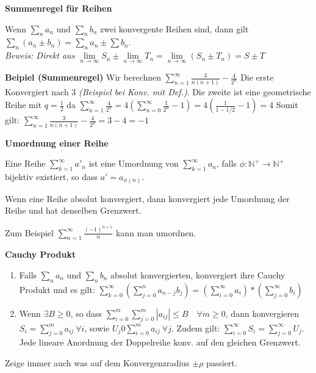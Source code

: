 \documentclass[25pt]{sciposter}
\newcommand{\limm}{\lim\limits_{n \to \infty}}
\newcommand{\N}{\mathbb{N}}
\newenvironment{method}[1]{\begin{mdframed}[backgroundcolor=blue!10,innertopmargin=15pt, innerbottommargin=15pt, nobreak=true]
		\textbf{#1 }
	}
	{ 
	\end{mdframed}
}
\newenvironment{important}{\begin{mdframed}[backgroundcolor=red!50,innertopmargin=15pt, innerbottommargin=15pt, nobreak=true]
		\Large
	}
	{ 
	\end{mdframed}
}
\begin{document}
\begin{multicols}{3}
\begin{method}{Summenregel für Reihen}
	Wenn $\sum_n a_n$ und $\sum_n b_n$ zwei konvergente Reihen sind, dann gilt $\sum_n (a_n \pm b_n ) = \sum_n a_n \pm \sum b_n$.\\
	\textit{Beweis: Direkt aus $\limm S_n \pm \limm T_n = \limm (S_n \pm T_n)  = S \pm T$}
\end{method}
\textbf{Beipiel (Summenregel)}
Wir berechnen $\sum_{n=1}^\infty \frac{3}{n(n+1)} - \frac{4}{2^n}$ Die erste Konvergiert nach $3$ \textit{(Beispiel bei Konv. mit Def.)}. Die zweite ist eine geometrische Reihe mit $q=\frac{1}{2}$ da $\sum_{n=1}^{\infty} \frac{4}{2^n} = 4\left( \sum_{n=0}^{\infty} \frac{1}{2^n} -1 \right) = 4 \left( \frac{1}{1-1/2} -1\right) = 4$
Somit gilt: $\sum_{n=1}^\infty \frac{3}{n(n+1)} - \frac{4}{2^n} = 3-4 = -1$ 


\begin{method}{Umordnung einer Reihe}
	Eine Reihe $\sum_{k=1}^{\infty} a'_n$ ist eine Umordnung von $\sum_{k=1}^{\infty} a_n$, falls $\phi : \N^+ \to \N^+$ bijektiv existiert, so dass $a' = a_{\phi(n)}$.
	
	Wenn eine Reihe absolut konvergiert, dann konvergiert jede Umordnung der Reihe und hat denselben Grenzwert.
	
	Zum Beispiel $\sum _{{n=1}}^{\infty }{\frac{(-1)^{{n+1}}}{n}}$ kann man umordnen.
\end{method}


\begin{method}{Cauchy Produkt}
	\begin{enumerate}
\item 	Falls $\sum_{n} a_n$ und $\sum_n b_n$ absolut konvergierten, konvergiert ihre Cauchy Produkt und es gilt:
$\sum_{k=0}^{\infty} \left(\sum_{j=0}^{n} a_{n-j} b_j\right) = \left(\sum_{i=0}^\infty a_i\right) * \left(\sum_{j=0}^\infty b_i\right)$

 \item Wenn $\exists B \geq 0$, so dass $\sum_{i=0}^{m} \sum_{j=0}^{m} |a_{ij}| \leq B \quad \forall m \geq 0$, dann konvergieren $S_i = \sum_{j=0}^{m} a_{ij} \ \forall i $, sowie $U_j 0 \sum_{i=0}^{m} a_{ij} \ \forall j$. Zudem gilt: $\sum_{i=0}^{\infty} S_i = \sum_{j=0}^{\infty} U_j$. Jede lineare Anordnung der Doppelreihe konv. auf den gleichen Grenzwert.
	\end{enumerate}
\end{method}


\begin{important}
Zeige immer auch was auf dem Konvergenzradius $\pm \rho$ passiert.
\end{important}



\end{multicols}
\end{document}
